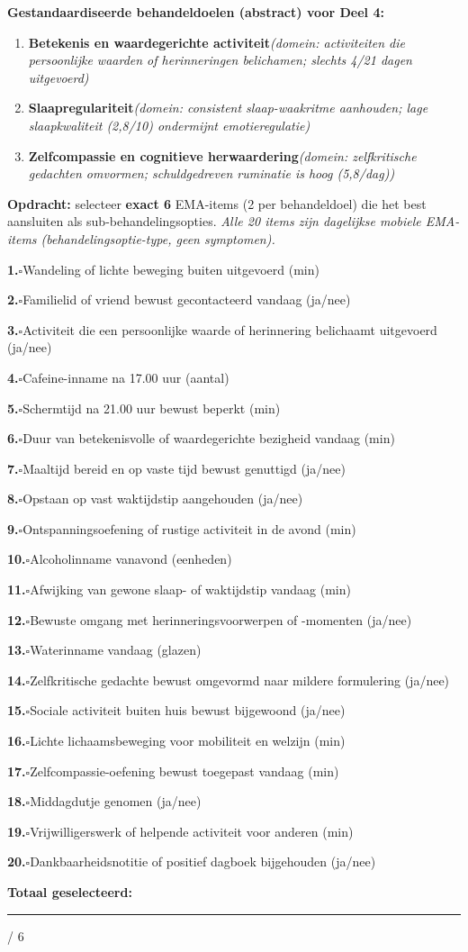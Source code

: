 \documentclass[11pt,a4paper]{article}
\newcommand{\checkitemBFS}[2]{%
\noindent\small\textbf{#1.}\hspace{0.45em}$\square$\hspace{0.4em}#2\par\vspace{0.20em}}
\begin{document}
\begin{contextbox}
\small\textbf{Gestandaardiseerde behandeldoelen (abstract) voor Deel 4:}
\begin{enumerate}[topsep=2pt,itemsep=1pt,label=\arabic*.]
\item \textbf{Betekenis en waardegerichte activiteit}\quad\textit{\small (domein: activiteiten die persoonlijke waarden of herinneringen belichamen; slechts 4/21 dagen uitgevoerd)}
\item \textbf{Slaapregulariteit}\quad\textit{\small (domein: consistent slaap-waakritme aanhouden; lage slaapkwaliteit (2,8/10) ondermijnt emotieregulatie)}
\item \textbf{Zelfcompassie en cognitieve herwaardering}\quad\textit{\small (domein: zelfkritische gedachten omvormen; schuldgedreven ruminatie is hoog (5,8/dag))}
\end{enumerate}
\end{contextbox}

\begin{responsebox}
\small\textbf{Opdracht:} selecteer \textbf{exact 6} EMA-items (2 per behandeldoel) die het best aansluiten als sub-behandelingsopties.
\textit{Alle 20 items zijn dagelijkse mobiele EMA-items (behandelingsoptie-type, geen symptomen).}

\checkitemBFS{1}{Wandeling of lichte beweging buiten uitgevoerd (min)}
\checkitemBFS{2}{Familielid of vriend bewust gecontacteerd vandaag (ja/nee)}
\checkitemBFS{3}{Activiteit die een persoonlijke waarde of herinnering belichaamt uitgevoerd (ja/nee)}
\checkitemBFS{4}{Cafeine-inname na 17.00 uur (aantal)}
\checkitemBFS{5}{Schermtijd na 21.00 uur bewust beperkt (min)}
\checkitemBFS{6}{Duur van betekenisvolle of waardegerichte bezigheid vandaag (min)}
\checkitemBFS{7}{Maaltijd bereid en op vaste tijd bewust genuttigd (ja/nee)}
\checkitemBFS{8}{Opstaan op vast waktijdstip aangehouden (ja/nee)}
\checkitemBFS{9}{Ontspanningsoefening of rustige activiteit in de avond (min)}
\checkitemBFS{10}{Alcoholinname vanavond (eenheden)}
\checkitemBFS{11}{Afwijking van gewone slaap- of waktijdstip vandaag (min)}
\checkitemBFS{12}{Bewuste omgang met herinneringsvoorwerpen of -momenten (ja/nee)}
\checkitemBFS{13}{Waterinname vandaag (glazen)}
\checkitemBFS{14}{Zelfkritische gedachte bewust omgevormd naar mildere formulering (ja/nee)}
\checkitemBFS{15}{Sociale activiteit buiten huis bewust bijgewoond (ja/nee)}
\checkitemBFS{16}{Lichte lichaamsbeweging voor mobiliteit en welzijn (min)}
\checkitemBFS{17}{Zelfcompassie-oefening bewust toegepast vandaag (min)}
\checkitemBFS{18}{Middagdutje genomen (ja/nee)}
\checkitemBFS{19}{Vrijwilligerswerk of helpende activiteit voor anderen (min)}
\checkitemBFS{20}{Dankbaarheidsnotitie of positief dagboek bijgehouden (ja/nee)}
\vspace{0.4em}
\noindent\textbf{Totaal geselecteerd:}\hspace{0.5em}\rule{1.2cm}{0.25pt}\hspace{0.2em}/ 6
\end{responsebox}
\end{document}
